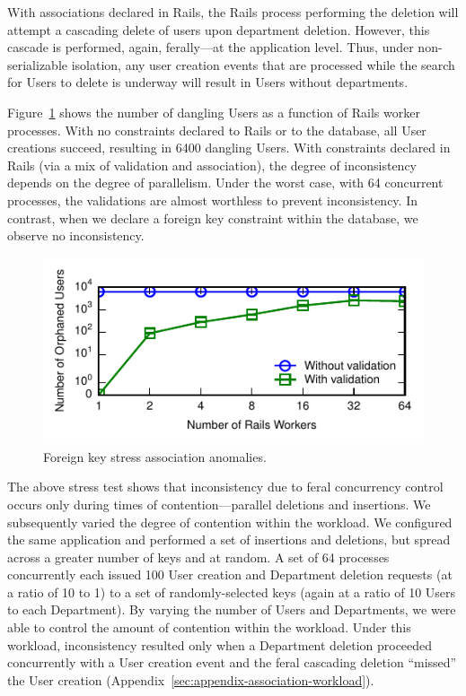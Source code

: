 With associations declared in Rails, the Rails process performing the
deletion will attempt a cascading delete of users upon department
deletion. However, this cascade is performed, again, ferally---at the
application level. Thus, under non-serializable isolation, any user creation
events that are processed while the search for Users to delete is
underway will result in Users without departments.

Figure~\ref{fig:fk-stress} shows the number of dangling Users as a
function of Rails worker processes. With no constraints declared to
Rails or to the database, all User creations succeed, resulting in
6400 dangling Users. With constraints declared in Rails (via a mix of
validation and association), the degree of inconsistency depends on
the degree of parallelism. Under the worst case, with 64 concurrent
processes, the validations are almost worthless to prevent
inconsistency. In contrast, when we declare a foreign key constraint
within the database, we observe no inconsistency.

\begin{figure}
\includegraphics[width=\columnwidth]{figs/fk-stress-violations.pdf}\vspace{-1em}
\caption{Foreign key stress association anomalies.}
\label{fig:fk-stress}
\end{figure}

The above stress test shows that inconsistency due to feral
concurrency control occurs only during times of contention---parallel
deletions and insertions. We subsequently varied the degree of
contention within the workload. We configured the same application and
performed a set of insertions and deletions, but spread across a
greater number of keys and at random. A set of 64 processes
concurrently each issued 100 User creation and Department deletion
requests (at a ratio of 10 to 1) to a set of randomly-selected keys
(again at a ratio of 10 Users to each Department). By varying the
number of Users and Departments, we were able to control the amount of
contention within the workload. Under this workload, inconsistency
resulted only when a Department deletion proceeded concurrently with a
User creation event and the feral cascading deletion ``missed'' the
User creation (Appendix~\ref{sec:appendix-association-workload}).

